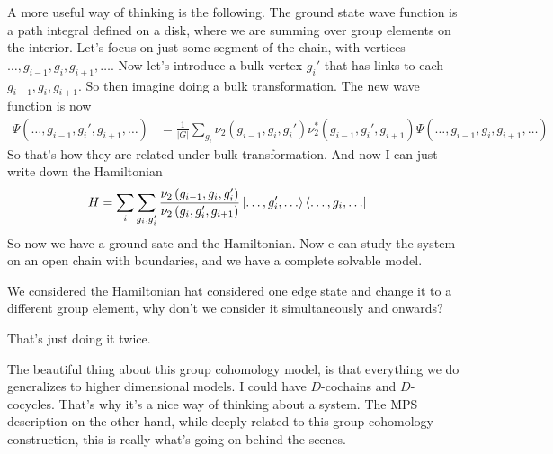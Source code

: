 A more useful way of thinking is the following.
The ground state wave function is a path integral defined on a disk,
where we are summing over group elements on the interior.
Let's focus on just some segment of the chain,
with vertices
$\ldots,g_{i-1},g_i,g_{i+1},\ldots$.
Now let's introduce a bulk vertex $g_i'$
that has links to each
$g_{i-1},g_i,g_{i+1}$.
So then imagine doing a bulk transformation.
The new wave function is now
\begin{align}
    \Psi\left( \ldots, g_{i-1}, g_i', g_{i+1},\ldots \right)
    &=
    \frac{1}{|G|}
    \sum_{g_i}
    \nu_2\left( g_{i-1}, g_i, g_i' \right)
    \nu_2^*\left( g_{i-1}, g_i', g_{i+1} \right)
    \Psi\left( \ldots, g_{i-1}, g_i, g_{i+1}, \ldots \right)
\end{align}
So that's how they are related under bulk transformation.
And now I can just write down the Hamiltonian
\begin{align}
    H &=
    \sum_i
    \sum_{g_i, g_i'}
    \frac{\nu_2\left( g_{i-1}, g_i, g_i' \right)}{
    \nu_2\left( g_i, g_i', g_{i+1}\right)
    }
    \ket{\ldots, g_i', \ldots}
    \bra{\ldots, g_i, \ldots}
\end{align}
So now we have a ground sate and the Hamiltonian.
Now e can study the system on an open chain with boundaries,
and we have a complete solvable model.

\begin{question}
    We considered the Hamiltonian hat considered one edge state and change it to
    a different group element,
    why don't we consider it simultaneously and onwards?
\end{question}
That's just doing it twice.

The beautiful thing about this group cohomology model,
is that everything we do generalizes to higher dimensional models.
I could have $D$-cochains and $D$-cocycles.
That's why it's a nice way of thinking about a system.
The MPS description on the other hand,
while deeply related to this group cohomology construction,
this is really what's going on behind the scenes.

